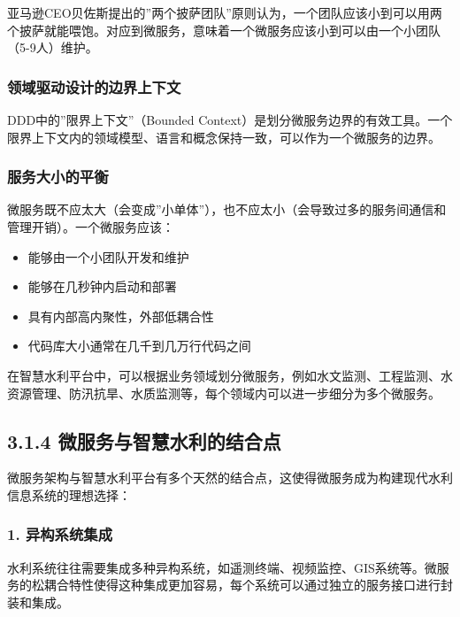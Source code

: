 亚马逊CEO贝佐斯提出的''两个披萨团队''原则认为，一个团队应该小到可以用两个披萨就能喂饱。对应到微服务，意味着一个微服务应该小到可以由一个小团队（5-9人）维护。

\subsubsection{领域驱动设计的边界上下文}\label{ux9886ux57dfux9a71ux52a8ux8bbeux8ba1ux7684ux8fb9ux754cux4e0aux4e0bux6587}

DDD中的''限界上下文''（Bounded
Context）是划分微服务边界的有效工具。一个限界上下文内的领域模型、语言和概念保持一致，可以作为一个微服务的边界。

\subsubsection{服务大小的平衡}\label{ux670dux52a1ux5927ux5c0fux7684ux5e73ux8861}

微服务既不应太大（会变成''小单体''），也不应太小（会导致过多的服务间通信和管理开销）。一个微服务应该：

\begin{itemize}
\tightlist
\item
  能够由一个小团队开发和维护
\item
  能够在几秒钟内启动和部署
\item
  具有内部高内聚性，外部低耦合性
\item
  代码库大小通常在几千到几万行代码之间
\end{itemize}

在智慧水利平台中，可以根据业务领域划分微服务，例如水文监测、工程监测、水资源管理、防汛抗旱、水质监测等，每个领域内可以进一步细分为多个微服务。

\subsection{3.1.4
微服务与智慧水利的结合点}\label{ux5faeux670dux52a1ux4e0eux667aux6167ux6c34ux5229ux7684ux7ed3ux5408ux70b9}

微服务架构与智慧水利平台有多个天然的结合点，这使得微服务成为构建现代水利信息系统的理想选择：

\subsubsection{1.
异构系统集成}\label{ux5f02ux6784ux7cfbux7edfux96c6ux6210}

水利系统往往需要集成多种异构系统，如遥测终端、视频监控、GIS系统等。微服务的松耦合特性使得这种集成更加容易，每个系统可以通过独立的服务接口进行封装和集成。

